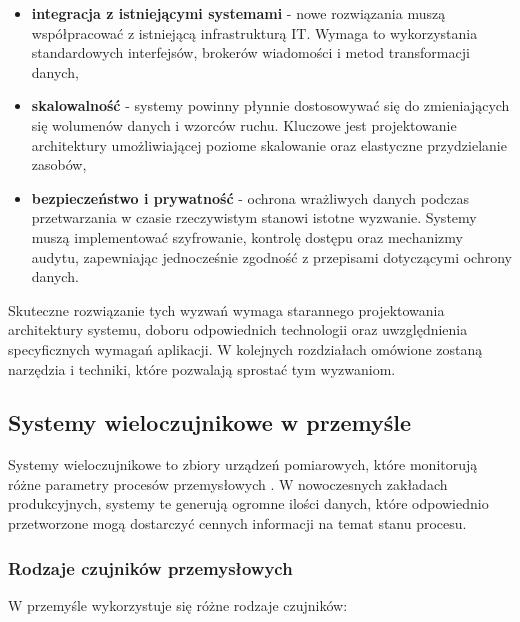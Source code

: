 \begin{itemize}
    \item \textbf{integracja z istniejącymi systemami} - nowe rozwiązania muszą współpracować z istniejącą infrastrukturą IT. Wymaga to wykorzystania standardowych interfejsów, brokerów wiadomości i metod transformacji danych,
    
    \item \textbf{skalowalność} - systemy powinny płynnie dostosowywać się do zmieniających się wolumenów danych i wzorców ruchu. Kluczowe jest projektowanie architektury umożliwiającej poziome skalowanie oraz elastyczne przydzielanie zasobów,
    
    \item \textbf{bezpieczeństwo i prywatność} - ochrona wrażliwych danych podczas przetwarzania w czasie rzeczywistym stanowi istotne wyzwanie. Systemy muszą implementować szyfrowanie, kontrolę dostępu oraz mechanizmy audytu, zapewniając jednocześnie zgodność z przepisami dotyczącymi ochrony danych.
\end{itemize}

Skuteczne rozwiązanie tych wyzwań wymaga starannego projektowania architektury systemu, doboru odpowiednich technologii oraz uwzględnienia specyficznych wymagań aplikacji. W kolejnych rozdziałach omówione zostaną narzędzia i techniki, które pozwalają sprostać tym wyzwaniom.

\subsection{Systemy wieloczujnikowe w przemyśle}
\label{subsec:systemy_wieloczujnikowe}

Systemy wieloczujnikowe to zbiory urządzeń pomiarowych, które monitorują różne parametry procesów przemysłowych \cite{multisensor_systems}.
W nowoczesnych zakładach produkcyjnych, systemy te generują ogromne ilości danych, które odpowiednio przetworzone mogą
dostarczyć cennych informacji na temat stanu procesu.

\subsubsection{Rodzaje czujników przemysłowych}
\label{subsubsec:rodzaje_czujnikow}

W przemyśle wykorzystuje się różne rodzaje czujników:

